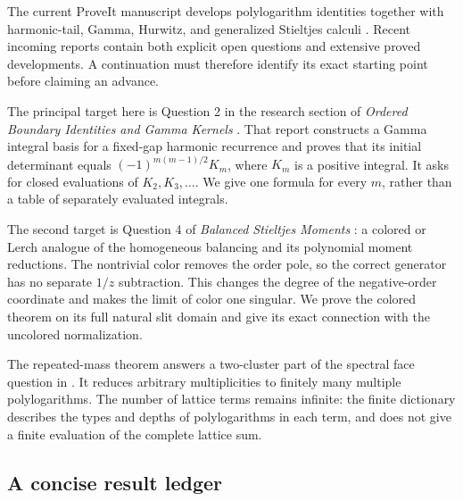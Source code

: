 \documentclass[11pt,a4paper]{article}
\numberwithin{equation}{section}
\theoremstyle{definition}
\theoremstyle{remark}
\begin{document}
The current ProveIt manuscript develops polylogarithm identities
together with harmonic-tail, Gamma, Hurwitz, and generalized Stieltjes
calculi \cite{repo}. Recent incoming reports contain both explicit open
questions and extensive proved developments. A continuation must therefore
identify its exact starting point before claiming an advance.

The principal target here is Question 2 in the research section of
\emph{Ordered Boundary Identities and Gamma Kernels} \cite{repoordered}.
That report constructs a Gamma integral basis for a fixed-gap harmonic
recurrence and proves that its initial determinant equals
$(-1)^{m(m-1)/2}K_m$, where $K_m$ is a positive integral. It asks for
closed evaluations of $K_2,K_3,\ldots$. We give one formula for every
$m$, rather than a table of separately evaluated integrals.

The second target is Question 4 of \emph{Balanced Stieltjes Moments}
\cite{repobalanced}: a colored or Lerch analogue of the homogeneous
balancing and its polynomial moment reductions. The nontrivial color
removes the order pole, so the correct generator has no separate
$1/z$ subtraction. This changes the degree of the negative-order
coordinate and makes the limit of color one singular. We prove the
colored theorem on its full natural slit domain and give its exact
connection with the uncolored normalization.

The repeated-mass theorem answers a two-cluster part of the spectral
face question in \cite{repolattice}. It reduces arbitrary multiplicities
to finitely many multiple polylogarithms. The number of lattice terms
remains infinite: the finite dictionary describes the types and depths
of polylogarithms in each term, and does not give a finite evaluation
of the complete lattice sum.

\subsection{A concise result ledger}
\end{document}
